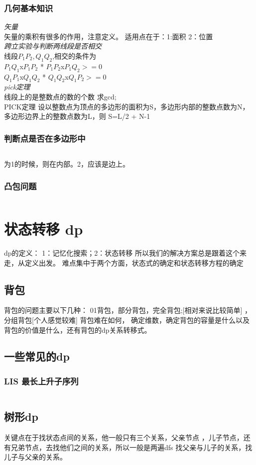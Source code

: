 \documentclass[a4paper,11pt]{article}
\begin{document}
\begin{CJK}{UTF8}{gbsn}
\subsubsection{几何基本知识}
\emph{矢量}\\
矢量的乘积有很多的作用，注意定义。
适用点在于：1:面积 2：位置\\
\emph{跨立实验与判断两线段是否相交}\\
线段$P_1P_2,Q_1Q_2$,相交的条件为\\
$P_1Q_1$x$P_1P_2$  *  $P_1P_2$x$P_1Q_2>=0$\\
$Q_1P_1$x$Q_1Q_2$  *  $Q_1Q_2$x$Q_1P_2>=0$\\
\emph{pick定理}\\
线段上的是整数点的数的个数 求gcd;\\
PICK定理 设以整数点为顶点的多边形的面积为S，多边形内部的整数点数为N，多边形边界上的整数点数为L，则 S=L/2 + N-1

\subsubsection{判断点是否在多边形中}
\inputminted{c++}{../scoure/math/jihe.cpp}
为1的时候，则在内部。2，应该是边上。
\subsubsection{凸包问题}
\inputminted{c++}{../scoure/math/tubao.cpp}
\section{状态转移 dp}
dp的定义：
1：记忆化搜索；2：状态转移
所以我们的解决方案总是跟着这个来走，从定义出发。
难点集中于两个方面，状态式的确定和状态转移方程的确定
\subsection{背包}
背包的问题主要以下几种：
01背包，部分背包，完全背包;[相对来说比较简单] ，分组背包[个人感觉较难]
背包难在如何， 确定维数，确定背包的容量是什么以及背包的价值是什么，还有背包的dp关系转移式。
\subsection{一些常见的dp}
\subsubsection{LIS 最长上升子序列}
\inputminted{c++}{../scoure/dp/longerxuelie.cpp}
\subsection{树形dp}
关键点在于找状态点间的关系，他一般只有三个关系，父亲节点
，儿子节点，还有兄弟节点，去找他们之间的关系，所以一般是两遍dfs
找父亲与儿子的关系，找儿子与父亲的关系。

\end{CJK}
\end{document}
